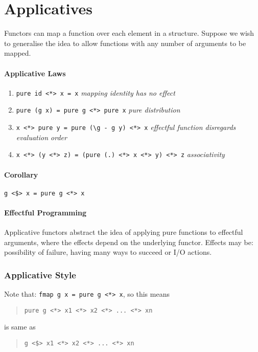 \documentclass{article}
\begin{document}
\section{Applicatives}
Functors can map a function over each element in a structure. Suppose we wish to generalise the idea to allow functions with \textcolor{Mulberry}{any number of arguments} to be mapped. 

\paragraph{Applicative Laws}
\begin{enumerate}
  \item \texttt{pure id <*> x = x} \textcolor{Mulberry}{\emph{mapping identity has no effect}}
  \item \texttt{pure (g x) = pure g <*> pure x} \textcolor{Mulberry}{\emph{pure distribution}}
  \item \texttt{x <*> pure y = pure (\textbackslash{}g -\> g y) <*> x} \textcolor{Mulberry}{\emph{effectful function disregards evaluation order}}
  \item \texttt{x <*> (y <*> z) = (pure (.) <*> x <*> y) <*> z} \textcolor{Mulberry}{\emph{associativity}}
\end{enumerate}

\paragraph{Corollary}
\verb|g <$> x = pure g <*> x|

\paragraph{Effectful Programming}
Applicative functors abstract the idea of applying \textcolor{Mulberry}{pure functions} to \textcolor{Mulberry}{effectful arguments}, where the effects depend on the underlying functor. Effects may be: possibility of failure, having many ways to succeed or I/O actions. \newline 
 
\subsubsection*{Applicative Style}
Note that: \textcolor{Emerald}{\texttt{fmap g x = pure g <*> x}}, so this means 
\begin{quote}
\textcolor{Emerald}{\texttt{pure g <*> x1 <*> x2 <*> ... <*> xn}}\par 
\end{quote}
is same as
\begin{quote}
\newline\textcolor{Emerald}{\texttt{g <\$> x1 <*> x2 <*> ... <*> xn}}
\end{quote}
\end{document}
